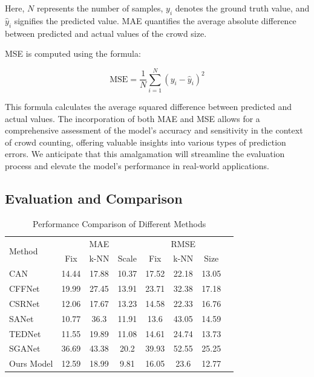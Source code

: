\documentclass[journal]{IEEEtran}
\begin{document}
Here, \( N \) represents the number of samples, \( y_i \) denotes the ground truth value, and \( \hat{y}_i \) signifies the predicted value. MAE quantifies the average absolute difference between predicted and actual values of the crowd size.

MSE is computed using the formula:

\[
\text{MSE} = \frac{1}{N} \sum_{i=1}^{N} \left( y_i - \hat{y}_i \right)^2
\]

This formula calculates the average squared difference between predicted and actual values. The incorporation of both MAE and MSE allows for a comprehensive assessment of the model's accuracy and sensitivity in the context of crowd counting, offering valuable insights into various types of prediction errors. We anticipate that this amalgamation will streamline the evaluation process and elevate the model's performance in real-world applications.

\subsection{Evaluation and Comparison}
\begin{table}[ht]
        \centering
        \caption{Performance Comparison of Different Methods}
        \begin{tabular}{l|ccccccc}
            \toprule
            \multirow{2}{*}{Method} & \multicolumn{3}{c}{MAE} & \multicolumn{3}{c}{RMSE} \\ \cmidrule(lr){2-4} \cmidrule(lr){5-7}
            & Fix & k-NN & Scale & Fix & k-NN & Size \\
            \midrule
            CAN         & 14.44 & 17.88 & 10.37 & 17.52 & 22.18 & 13.05 \\
            CFFNet      & 19.99 & 27.45 & 13.91 & 23.71 & 32.38 & 17.18 \\
            CSRNet      & 12.06 & 17.67 & 13.23 & 14.58 & 22.33 & 16.76 \\
            SANet       & 10.77 & 36.3  & 11.91 & 13.6  & 43.05 & 14.59 \\
            TEDNet      & 11.55 & 19.89 & 11.08 & 14.61 & 24.74 & 13.73 \\
            SGANet      & 36.69 & 43.38 & 20.2  & 39.93 & 52.55 & 25.25 \\
            Ours Model  & 12.59 & 18.99 & 9.81  & 16.05 & 23.6  & 12.77 \\
            \bottomrule
        \end{tabular}
    \end{table}
\end{document}
